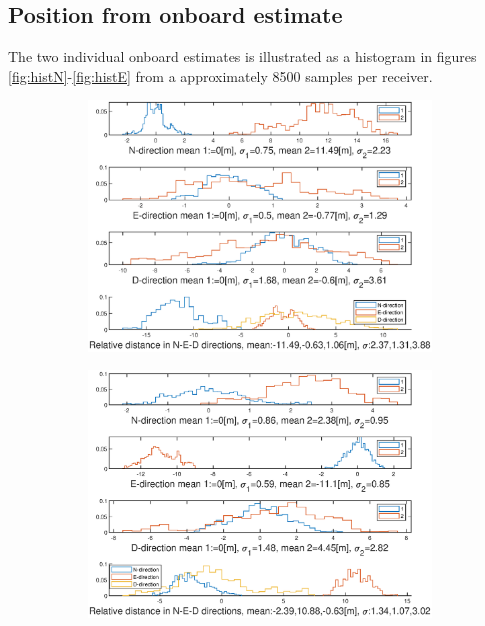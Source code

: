 \subsection{Position from onboard estimate} \label{onBoardSolution}
The two individual onboard estimates is illustrated as a histogram in figures \ref{fig:histN}-\ref{fig:histE} from a approximately 8500 samples per receiver.
\begin{figure}
\centering
\begin{subfigure}{\textwidth}
\includegraphics[width=\textwidth]{Results/GPShist10mN.eps}
\end{subfigure}
\begin{subfigure}{\textwidth}
\centering
\includegraphics[width=\textwidth]{Results/GPShist10mE.eps}

\end{subfigure}
\end{figure}
